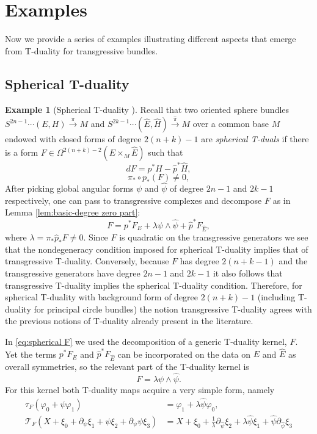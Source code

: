 \documentclass[12pt,twoside]{article}
\theoremstyle{plain}
\theoremstyle{definition}
\newtheorem{example}[theorem]{Example}
\newcommand{\gf}{\text{$\varphi$}}
\newcommand{\del}{\text{$\partial$}}
\newcommand{\mc}[1]{\text{$\mathcal{#1}$}}
\numberwithin{equation}{section}
\begin{document}
\section{Examples}

Now we provide a series of examples illustrating different aspects that emerge from T-duality for transgressive bundles.

\subsection{Spherical T-duality}
\begin{example}[Spherical T-duality \cite{BEM15,BEM15b,CHU24,LSW16}] 
Recall that  two oriented sphere bundles  $S^{2n-1}\cdots (E,H)\stackrel{\pi}{\longrightarrow} M$ and $S^{2k-1}\cdots (\hat{E},\hat{H})\stackrel{\hat{\pi}}{\to} M$ over a common base $M$ endowed with closed forms of degree $2(n+k)-1$ are \emph{spherical T-duals} if there is a form $F \in \Omega^{2(n+k)-2}(E \times_M \hat{E})$ such that
\begin{equation}\label{eq:condition1}
dF = p^*H - \hat{p}^*\hat{H},
\end{equation}
\begin{equation}\label{eq:condition2}
\pi_* \circ p_* (F) \neq 0,
\end{equation}
After picking global angular forms $\psi$ and $\hat{\psi}$ of degree $2n-1$ and $2k-1$ respectively, one can pass to transgressive complexes and decompose $F$ as in Lemma \ref{lem:basic-degree zero part}:
\begin{equation}\label{eq:spherical F}
F  = p^*F_E + \lambda \psi\wedge \hat{\psi} + \hat{p}^*F_{\hat{E}},
\end{equation}
where $\lambda = \pi_*\hat{p}_*F \neq 0$. Since $F$ is quadratic on the transgressive generators we see that the nondegeneracy condition imposed for spherical T-duality implies that of transgressive T-duality. Conversely, because $F$ has degree $2(n+k-1)$ and the transgressive generators have degree $2n-1$ and $2k-1$ it also follows that transgressive T-duality implies the spherical T-duality condition. Therefore, for spherical T-duality with background form of degree $2(n+k)-1$ (including T-duality for principal circle bundles) the notion transgressive T-duality agrees with the previous notions of T-duality already present in the literature.

In \eqref{eq:spherical F} we used the decomposition of a generic T-duality kernel, $F$. Yet the terms $p^*F_E$ and $\hat{p}^*F_{\hat{E}}$ can be incorporated on the data on $E$ and $\hat{E}$ as overall symmetries, so the relevant part of the T-duality kernel is
\[F  =\lambda \psi\wedge \hat{\psi}.\]
For this kernel both T-duality maps acquire a very simple form, namely
\begin{align*}
\tau_F (\gf_0 + \psi\gf_1) &= \gf_1 + \lambda \hat \psi \gf_0,\\
 \mc{T}_F(X + \xi_0 + \del_\psi \xi_1+ \psi\xi_2 + \del_{\psi} \psi \xi_3)& = X + \xi_0 + \frac{1}{\lambda}\del_{\hat{\psi}} \xi_2+ \lambda\hat{\psi}\xi_1 +  \hat{\psi}\del_{\hat\psi} \xi_3
\end{align*}
\end{example}
\end{document}
